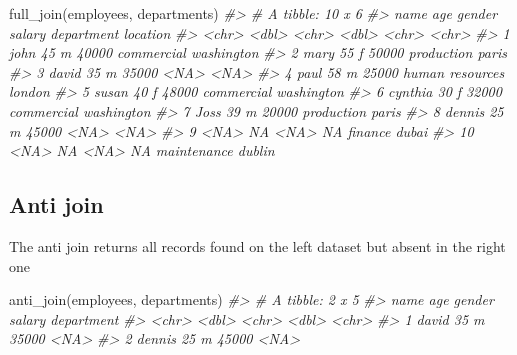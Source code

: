\documentclass[
]{book}
\newenvironment{Shaded}{\begin{snugshade}}{\end{snugshade}}
\newcommand{\CommentTok}[1]{\textcolor[rgb]{0.56,0.35,0.01}{\textit{#1}}}
\newcommand{\FunctionTok}[1]{\textcolor[rgb]{0.00,0.00,0.00}{#1}}
\newcommand{\NormalTok}[1]{#1}
\begin{document}
\begin{Shaded}
\begin{Highlighting}[]
\FunctionTok{full\_join}\NormalTok{(employees, departments)}
\CommentTok{\#\textgreater{} \# A tibble: 10 x 6}
\CommentTok{\#\textgreater{}    name      age gender salary department      location  }
\CommentTok{\#\textgreater{}    \textless{}chr\textgreater{}   \textless{}dbl\textgreater{} \textless{}chr\textgreater{}   \textless{}dbl\textgreater{} \textless{}chr\textgreater{}           \textless{}chr\textgreater{}     }
\CommentTok{\#\textgreater{}  1 john       45 m       40000 commercial      washington}
\CommentTok{\#\textgreater{}  2 mary       55 f       50000 production      paris     }
\CommentTok{\#\textgreater{}  3 david      35 m       35000 \textless{}NA\textgreater{}            \textless{}NA\textgreater{}      }
\CommentTok{\#\textgreater{}  4 paul       58 m       25000 human resources london    }
\CommentTok{\#\textgreater{}  5 susan      40 f       48000 commercial      washington}
\CommentTok{\#\textgreater{}  6 cynthia    30 f       32000 commercial      washington}
\CommentTok{\#\textgreater{}  7 Joss       39 m       20000 production      paris     }
\CommentTok{\#\textgreater{}  8 dennis     25 m       45000 \textless{}NA\textgreater{}            \textless{}NA\textgreater{}      }
\CommentTok{\#\textgreater{}  9 \textless{}NA\textgreater{}       NA \textless{}NA\textgreater{}       NA finance         dubai     }
\CommentTok{\#\textgreater{} 10 \textless{}NA\textgreater{}       NA \textless{}NA\textgreater{}       NA maintenance     dublin}
\end{Highlighting}
\end{Shaded}

\hypertarget{anti-join}{%
\subsection{Anti join}\label{anti-join}}

The anti join returns all records found on the left dataset but absent in the right one

\begin{Shaded}
\begin{Highlighting}[]
\FunctionTok{anti\_join}\NormalTok{(employees, departments)}
\CommentTok{\#\textgreater{} \# A tibble: 2 x 5}
\CommentTok{\#\textgreater{}   name     age gender salary department}
\CommentTok{\#\textgreater{}   \textless{}chr\textgreater{}  \textless{}dbl\textgreater{} \textless{}chr\textgreater{}   \textless{}dbl\textgreater{} \textless{}chr\textgreater{}     }
\CommentTok{\#\textgreater{} 1 david     35 m       35000 \textless{}NA\textgreater{}      }
\CommentTok{\#\textgreater{} 2 dennis    25 m       45000 \textless{}NA\textgreater{}}
\end{Highlighting}
\end{Shaded}
\end{document}
